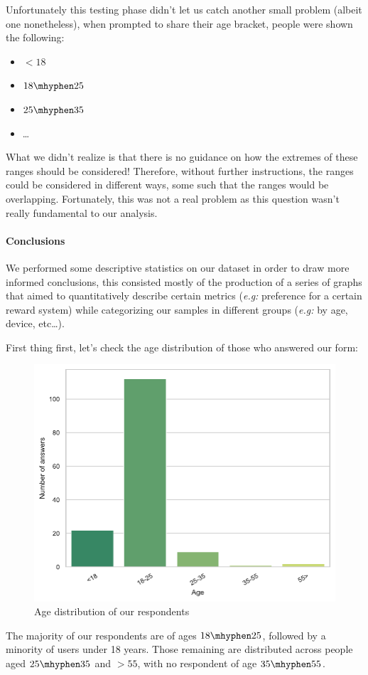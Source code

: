 \documentclass[a4paper, 11pt]{report}
\begin{document}
Unfortunately this testing phase didn't let us catch another small problem (albeit one nonetheless),
when prompted to share their age bracket, people were shown the following:
\begin{itemize}
	\item $< 18$
	\item $18 \mhyphen 25$
	\item $25 \mhyphen 35$
	\item \dots
\end{itemize}

What we didn't realize is that there is no guidance on how the extremes of these ranges should be considered!
Therefore, without further instructions, the ranges could be considered in different ways, some such that
the ranges would be overlapping.
Fortunately, this was not a real problem as this question wasn't really fundamental to our analysis.

\paragraph{Conclusions}
We performed some descriptive statistics on our dataset in order to draw more informed conclusions,
this consisted mostly of the production of a series of graphs that aimed to quantitatively
describe certain metrics (\emph{e.g:} preference for a certain reward system) while categorizing
our samples in different groups (\emph{e.g:} by age, device, etc\dots).


First thing first, let's check the age distribution of those who answered our form:
\begin{figure}[H]
	\centering
	\includegraphics[width=.5\textwidth]{img/analysis/age_distribution.pdf}
	\caption{Age distribution of our respondents}
\end{figure}
The majority of our respondents are of ages $18 \mhyphen 25$, followed by a minority of users under 18 years. Those remaining are distributed across people aged
$25 \mhyphen 35$ and $>55$, with no respondent of age $35 \mhyphen 55$.
\end{document}
